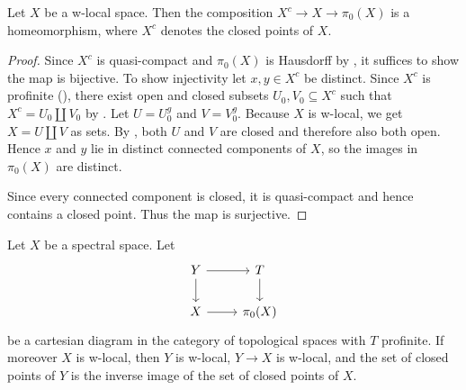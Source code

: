 \begin{lemma}
    \label{thm:closed-points-isom-pi0}
    Let \(X\) be a w-local space. Then the composition $X^c \to X \to \pi_0(X)$ is a homeomorphism,
    where $X^c$ denotes the closed points of $X$.
\end{lemma}

\begin{proof}
    Since $X^c$ is quasi-compact and $\pi_0(X)$ is Hausdorff by , it suffices
    to show the map is bijective.
    To show injectivity let $x, y \in X^c$ be distinct. Since $X^c$ is profinite
    (), there
    exist open and closed subsets $U_0, V_0 \subseteq X^c$ such that
    $X^c = U_0 \coprod V_0$ by .
    Let $U = U_0^g$ and $V = V_0^g$. Because $X$ is w-local, we get
    $X = U \coprod V$ as sets. By ,
    both $U$ and $V$ are closed and therefore also both open. Hence
    $x$ and $y$ lie in distinct connected components of $X$, so the images in $\pi_0(X)$ are distinct.

    Since every connected component is closed, it is quasi-compact and hence contains a closed point. Thus
    the map is surjective.
\end{proof}

\begin{lemma}
Let $X$ be a spectral space. Let
\[
\begin{tikzcd}
Y \arrow[r] \arrow[d] & T \arrow[d] \\
X \arrow[r] & \pi_0(X)
\end{tikzcd}
\]
be a cartesian diagram in the category of topological spaces with $T$ profinite. If moreover $X$ is w-local, then $Y$ is w-local, $Y \to X$ is w-local, and the set of closed points of $Y$ is the inverse image of the set of closed points of $X$.
\label{thm:cartesian-profinite-w-local}
\end{lemma}

